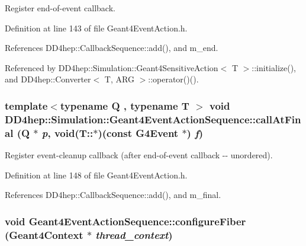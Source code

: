 Register end-\/of-\/event callback. 

Definition at line 143 of file Geant4EventAction.h.

References DD4hep::CallbackSequence::add(), and m\_\-end.

Referenced by DD4hep::Simulation::Geant4SensitiveAction$<$ T $>$::initialize(), and DD4hep::Converter$<$ T, ARG $>$::operator()().\hypertarget{class_d_d4hep_1_1_simulation_1_1_geant4_event_action_sequence_ae7a55dcc337b690ff07f86614416a8d5}{
\subsubsection[{callAtFinal}]{\setlength{\rightskip}{0pt plus 5cm}template$<$typename Q , typename T $>$ void DD4hep::Simulation::Geant4EventActionSequence::callAtFinal (Q $\ast$ {\em p}, \/  void(T::$\ast$)(const G4Event $\ast$) {\em f})}}
\label{class_d_d4hep_1_1_simulation_1_1_geant4_event_action_sequence_ae7a55dcc337b690ff07f86614416a8d5}


Register event-\/cleanup callback (after end-\/of-\/event callback -\/-\/ unordered). 

Definition at line 148 of file Geant4EventAction.h.

References DD4hep::CallbackSequence::add(), and m\_\-final.\hypertarget{class_d_d4hep_1_1_simulation_1_1_geant4_event_action_sequence_a552fac0ec8632b417f81453b4d79e0c4}{
\subsubsection[{configureFiber}]{\setlength{\rightskip}{0pt plus 5cm}void Geant4EventActionSequence::configureFiber ({\bf Geant4Context} $\ast$ {\em thread\_\-context})}}
\label{class_d_d4hep_1_1_simulation_1_1_geant4_event_action_sequence_a552fac0ec8632b417f81453b4d79e0c4}


